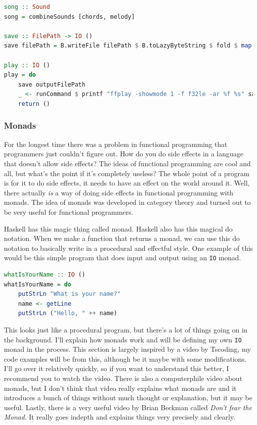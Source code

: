 \documentclass[11pt]{article}
\begin{document}
\begin{lstlisting}[language=Haskell, basicstyle=\tiny]
song :: Sound
song = combineSounds [chords, melody]

save :: FilePath -> IO ()
save filePath = B.writeFile filePath $ B.toLazyByteString $ fold $ map B.floatLE song

play :: IO ()
play = do
    save outputFilePath
    _ <- runCommand $ printf "ffplay -showmode 1 -f f32le -ar %f %s" sampleRate outputFilePath
    return ()
\end{lstlisting}

\subsubsection{Monads}\label{monads}

For the longest time there was a problem in functional programming that
programmers just couldn't figure out. How do you do side effects in a language
that doesn't allow side effects? The ideas of functional programming are cool
and all, but what's the point if it's completely useless? The whole point of a
program is for it to do side effects, it needs to have an effect on the world
around it. Well, there actually \emph{is} a way of doing side effects in
functional programming with monads. The idea of monads was developed in
category theory and turned out to be very useful for functional programmers.

Haskell has this magic thing called monad. Haskell also has this magical do
notation. When we make a function that returns a monad, we can use this do
notation to basically write in a procedural and effectful style. One example of
this would be this simple program that does input and output using an
\texttt{IO} monad.

\begin{lstlisting}[language=Haskell]
whatIsYourName :: IO ()
whatIsYourName = do
    putStrLn "What is your name?"
    name <- getLine
    putStrLn ("Hello, " ++ name)
\end{lstlisting}

This looks just like a procedural program, but there's a lot of things going on
in the background. I'll explain how monads work and will be defining my own
\texttt{IO} monad in the process. This section is largely inspired by a video
by Tscoding, my code examples will be from this, although be it maybe with some
modifications. I'll go over it relatively quickly, so if you want to understand
this better, I recommend you to watch the video. There is also a computerphile
video about monads, but I don't think that video really explains what monads
are and it introduces a bunch of things without much thought or explanation,
but it may be useful. Lastly, there is a very useful video by Brian Beckman
called \emph{Don't fear the Monad}. It really goes indepth and explains things
very precisely and clearly.
\end{document}
